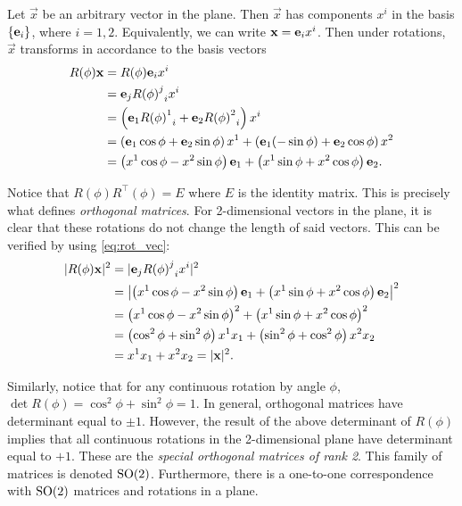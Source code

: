     Let $\vec{x}$ be an arbitrary vector in the plane. Then $\vec{x}$ has components $x^i$ in the basis $\{\mathbf{e}_i\}$, where $i=1,2$. Equivalently, we can write $\mathbf{x}=\mathbf{e}_i x^i$. Then under rotations, $\vec{x}$ transforms in accordance to the basis vectors
    \begin{align}
        R(\phi)\mathbf{x} &= R(\phi)\mathbf{e}_i x^i \label{eq:rot_vec} \\
        &= \mathbf{e}_j{{R(\phi)}^j}_i x^i \nonumber \\
        &= \left( \mathbf{e}_1{{R(\phi)}^1}_i + \mathbf{e}_2{{R(\phi)}^2}_i \right)x^i \nonumber \\
        &= \left( \mathbf{e}_1\cos\phi + \mathbf{e}_2\sin\phi \right) x^1 + \left( \mathbf{e}_1(-\sin\phi) + \mathbf{e}_2\cos\phi \right) x^2 \nonumber \\
        &= \left( x^1\cos\phi - x^2\sin\phi \right)\mathbf{e}_1 + \left( x^1\sin\phi + x^2\cos\phi \right)\mathbf{e}_2.  \nonumber
    \end{align}

    Notice that $R(\phi)R^\top(\phi) = E$ where $E$ is the identity matrix. This is precisely what defines \textit{orthogonal matrices}. For 2-dimensional vectors in the plane, it is clear that these rotations do not change the length of said vectors. This can be verified by using \cref{eq:rot_vec}:
    \begin{align}
        |R(\phi)\mathbf{x}|^2 &= |\mathbf{e}_j{{R(\phi)}^j}_i x^i|^2 \\
        &= \left|\left( x^1\cos\phi - x^2\sin\phi \right)\mathbf{e}_1 + \left( x^1\sin\phi + x^2\cos\phi \right)\mathbf{e}_2\right|^2 \nonumber \\
        &= {\left( x^1\cos\phi - x^2\sin\phi \right)}^2 + {\left( x^1\sin\phi + x^2\cos\phi \right)}^2 \nonumber \\
        &= \left( \cos^2\phi + \sin^2\phi \right)x^1 x_1 + \left( \sin^2\phi + \cos^2\phi \right)x^2 x_2 \nonumber \\
        &= x^1 x_1 + x^2 x_2 = |\mathbf{x}|^2. \nonumber
    \end{align}

    Similarly, notice that for any continuous rotation by angle $\phi$, $\det R(\phi) = \cos^2\phi+\sin^2\phi = 1$. In general, orthogonal matrices have determinant equal to $\pm1$. However, the result of the above determinant of $R(\phi)$ implies that all continuous rotations in the 2-dimensional plane have determinant equal to $+1$. These are the \textit{special orthogonal matrices of rank 2}. This family of matrices is denoted $\textrm{SO}{(2)}$. Furthermore, there is a one-to-one correspondence with $\textrm{SO}{(2)}$ matrices and rotations in a plane.

